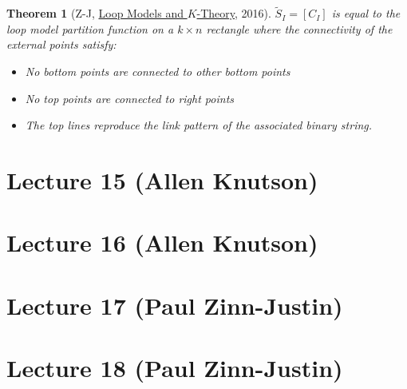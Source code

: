 \documentclass[12pt]{amsart}
\numberwithin{equation}{section}
\newtheorem{Theorem}[equation]{Theorem}
\theoremstyle{definition}
\numberwithin{figure}{section}
\newcommand{\Stil}{\tilde{S}}
\begin{document}
\begin{Theorem}[Z-J, \href{https://doi.org/10.3842/SIGMA.2018.069}{Loop Models and $K$-Theory}, 2016]
	$\Stil_I = [C_I]$ is equal to the loop model partition function on a $k \times n$ rectangle where the connectivity of the external points satisfy:
	\begin{itemize}
		\item No bottom points are connected to other bottom points
		\item No top points are connected to right points
		\item The top lines reproduce the link pattern of the associated binary string.
	\end{itemize}
\end{Theorem}

\section{Lecture 15 (Allen Knutson)}

\section{Lecture 16 (Allen Knutson)}

\section{Lecture 17 (Paul Zinn-Justin)}

\section{Lecture 18 (Paul Zinn-Justin)}
\end{document}
